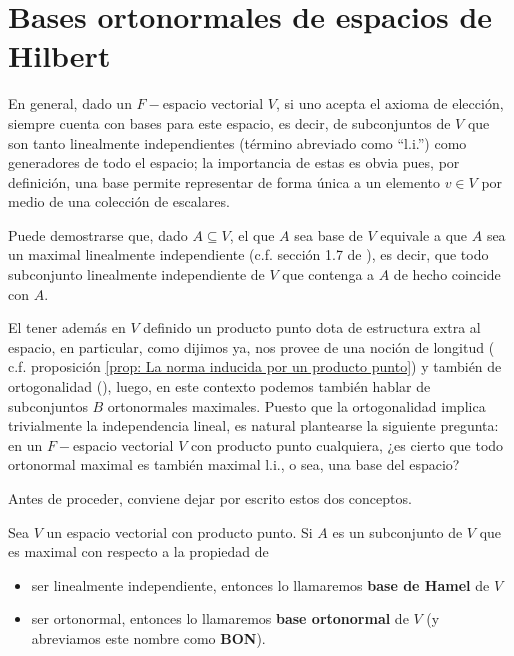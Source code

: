 \section{Bases ortonormales de espacios de Hilbert}
\label{Bases ortonormales de espacios de Hilbert}

En general, dado un $F-$espacio vectorial $V$,
si uno acepta el axioma de elección, siempre cuenta con 
bases para este espacio,
es decir, de subconjuntos de $V$ que son tanto linealmente
independientes (término abreviado como ``l.i.'') como generadores
de todo el espacio; la importancia de 
estas es obvia pues, por definición, una base permite representar
de forma única a un elemento $v \in V$ por medio
de una colección de escalares. 


Puede demostrarse
que, dado $A \subseteq V$, el que $A$ sea base de $V$
equivale a que $A$ sea un maximal linealmente
independiente (c.f. sección 1.7 de \cite{friedberg}), es decir,
que todo subconjunto  linealmente
independiente de $V$ que contenga
a $A$ de hecho coincide con $A$.


El tener además en $V$ definido un producto punto
dota de estructura extra al espacio, en particular, 
como dijimos ya,
nos provee de una noción de longitud (
c.f. proposición \ref{prop: La norma inducida por un producto punto}) 
y también 
de ortogonalidad (), luego, en este 
contexto podemos también hablar de subconjuntos $B$
ortonormales maximales. Puesto que la ortogonalidad implica
trivialmente la independencia lineal, es natural plantearse
la siguiente pregunta: en un $F-$espacio vectorial $V$
con producto punto
cualquiera, ¿es cierto que todo ortonormal maximal es también
maximal l.i., o sea, una base
del espacio? 

Antes de proceder, 
conviene dejar por escrito estos dos conceptos.

\begin{defi} \label{defi: BON y base de Hamel}
Sea $V$ un espacio vectorial con producto punto.
Si $A$ es un subconjunto de $V$ que es 
maximal con respecto a la propiedad de
\begin{itemize}
\item ser linealmente independiente, entonces lo llamaremos
\textbf{base de Hamel} de $V$
\item ser ortonormal, entonces lo llamaremos
\textbf{base ortonormal} de $V$ (y abreviamos este
nombre como \textbf{BON}).
\end{itemize}
\end{defi}


